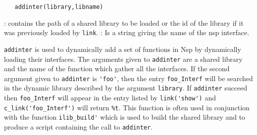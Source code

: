 
\begin{mandesc}
\end{mandesc}
\label{addinter}
\begin{calling_sequence}
\begin{verbatim}
   addinter(library,libname)  
\end{verbatim}
\end{calling_sequence}
\begin{parameters}
  \begin{varlist}
    : contains the path of a shared library to be loaded 
    or the id of the library if it was previously loaded by \verb!link!.
    :  Is a string giving the name of the nsp interface.
  \end{varlist}
\end{parameters}
\begin{mandescription}
  \verb!addinter! is used to dynamically add a set of functions in Nsp 
  by dynamically loading their interfaces. 
  The arguments given to \verb!addinter! are a shared library and the name of the function which gather all the interfaces. If the second argument 
  given to \verb!addinter! is \verb!'foo'!, then the entry \verb!foo_Interf! 
  will be searched in the dynamic library described by the argument \verb!library!. If \verb!addinter! succeed then \verb!foo_Interf! will appear in 
  the entry listed by \verb!link('show')! and \verb!c_link('foo_Interf')! 
  will return \verb!%t!. 
  This function is often used in conjunction with the function 
  \verb!ilib_build'! which is used to build the shared library and 
  to produce a script containing the call to \verb!addinter!.
\end{mandescription}
\begin{manseealso}
\end{manseealso}

